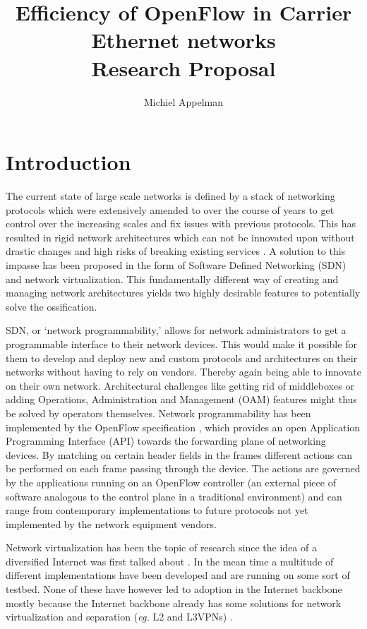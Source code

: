 \documentclass[oneside,twocolumn,7pt,a4paper]{article}
\title{Efficiency of OpenFlow in Carrier Ethernet networks \\[0.3cm]
\large{Research Proposal}}
\author{Michiel Appelman}
\begin{document}
	\maketitle
	
	\section{Introduction} %
	\label{sec:introduction}
	The current state of large scale networks is defined by a stack of networking protocols which were extensively amended to over the course of years to get control over the increasing scales and fix issues with previous protocols. This has resulted in rigid network architectures which can not be innovated upon without drastic changes and high risks of breaking existing services \cite{diversifiedinternet,overcomingimpasse}. A solution to this impasse has been proposed in the form of Software Defined Networking (SDN) and network virtualization. This fundamentally different way of creating and managing network architectures yields two highly desirable features to potentially solve the ossification. 

	SDN, or `network programmability,' allows for network administrators to get a programmable interface to their network devices. This would make it possible for them to develop and deploy new and custom protocols and architectures on their networks without having to rely on vendors. Thereby again being able to innovate on their own network. Architectural challenges like getting rid of middleboxes or adding Operations, Administration and Management (OAM) features might thus be solved by operators themselves. 
	Network programmability has been implemented by the OpenFlow specification \cite{openflow}, which provides an open Application Programming Interface (API) towards the forwarding plane of networking devices. By matching on certain header fields in the frames different actions can be performed on each frame passing through the device. The actions are governed by the applications running on an OpenFlow controller (an external piece of software analogous to the control plane in a traditional environment) and can range from contemporary implementations to future protocols not yet implemented by the network equipment vendors.

	Network virtualization has been the topic of research since the idea of a diversified Internet was first talked about \cite{diversifiedinternet}. In the mean time a multitude of different implementations have been developed and are running on some sort of testbed. None of these have however led to adoption in the Internet backbone mostly because the Internet backbone already has some solutions for network virtualization and separation (\textsl{eg.} L2 and L3VPNs) \cite{net-virt10}. 
	
\end{document}
